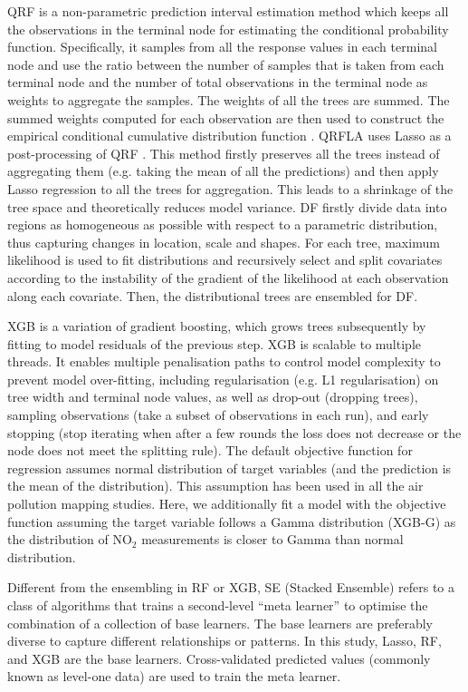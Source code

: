 \documentclass{article}
\begin{document}
QRF is a non-parametric prediction interval estimation method which keeps all the observations in the terminal node for estimating the conditional probability function. Specifically, it samples from all the response values in each terminal node and use the ratio between the number of samples that is taken from each terminal node and the number of total observations in the terminal node as weights to aggregate the samples. The weights of all the trees are summed. The summed weights computed for each observation are then used to construct the empirical conditional cumulative distribution function \citep{meinshausen2006quantile}. QRFLA uses Lasso as a post-processing of QRF \citep[][page 617]{hastie2017elements}. This method firstly preserves all the trees instead of aggregating them (e.g. taking the mean of all the predictions) and then apply Lasso regression to all the trees for aggregation. This leads to a shrinkage of the tree space and theoretically reduces model variance. DF \citep{schlosser2019distributional} firstly divide data into regions as homogeneous as possible with respect to a parametric distribution, thus capturing changes in location, scale and shapes. For each tree, maximum likelihood is used to fit distributions and recursively select and split covariates according to the instability of the gradient of the likelihood at each observation along each covariate. Then, the distributional trees are ensembled for DF.

XGB is a variation of gradient boosting, which grows trees subsequently by fitting to model residuals of the previous step. XGB is scalable to multiple threads. It enables multiple penalisation paths to control model complexity to prevent model over-fitting, including regularisation (e.g. L1 regularisation) on tree width and terminal node values, as well as drop-out (dropping trees), sampling observations (take a subset of observations in each run), and early stopping (stop iterating when after a few rounds the loss does not decrease or the node does not meet the splitting rule). The default objective function for regression assumes normal distribution of target variables (and the prediction is the mean of the distribution). This assumption has been used in all the air pollution mapping studies. Here, we additionally fit a model with the objective function assuming the target variable follows a Gamma distribution (XGB-G) as the distribution of NO$_2$ measurements is closer to Gamma than normal distribution.  

Different from the ensembling in RF or XGB, SE (Stacked Ensemble) refers to a class of algorithms that trains a second-level “meta learner” to optimise the combination of a collection of base learners. The base learners are preferably diverse to capture different relationships or patterns. In this study, Lasso, RF, and XGB are the base learners. Cross-validated predicted values (commonly known as level-one data) are used to train the meta learner.  
\end{document}
